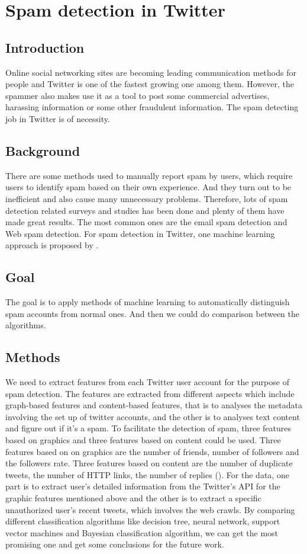 \documentclass[../proposal.tex]{subfiles}
\begin{document}
\section{Spam detection in Twitter}

\subsection{Introduction}

Online social networking sites are becoming leading communication methods for
people and Twitter is one of the fastest growing one among them. However, the
spammer also makes use it as a tool to post some commercial advertises,
harassing information or some other fraudulent information. The spam detecting
job in Twitter is of necessity.

\subsection{Background}
There are some methods used to manually report spam by users, which require
users to identify spam based on their own experience. And they turn out to be
inefficient and also cause many unnecessary problems. Therefore, lots of spam
detection related surveys and studies has been done and plenty of them have
made great results. The most common ones are the email spam detection and Web
spam detection. For spam detection in Twitter, one machine learning approach is
proposed by \cite{wang2010detecting}.

\subsection{Goal}
The goal is to apply methods of machine learning to automatically distinguish
spam accounts from normal ones. And then we could do comparison between the
algorithms.

\subsection{Methods}
We need to extract features from each Twitter user account for the purpose of
spam detection. The features are extracted from different aspects which include
graph-based features and content-based features, that is to analyses the
metadata involving the set up of twitter accounts, and the other is to analyses
text content and figure out if it’s a spam. To facilitate the detection of
spam,  three features based on graphics and three features based on content
could be used. Three features based on on graphics are the number of friends,
number of followers and the followers rate. Three features based on content are
the number of duplicate tweets, the number of HTTP links, the number of replies
(\cite{wang2010don}). For the data, one part is to extract user's detailed
information from the Twitter's API for the graphic features mentioned above and
the other is to extract a specific unauthorized user's recent tweets, which
involves the web crawls. By comparing different classification algorithms like
decision tree, neural network, support vector machines and Bayesian
classification algorithm, we can get the most promising one and get some
conclusions for the future work.
\end{document}
